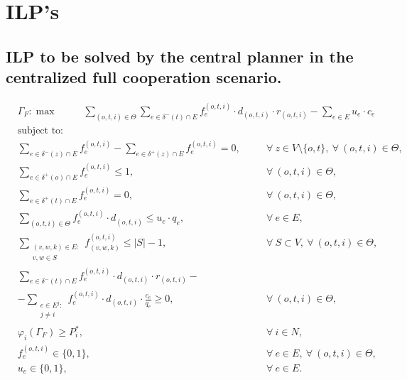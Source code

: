 \documentclass[review]{elsarticle}
\begin{document}


\appendix
\section{ILP's}
\label{seq:appendixilp}

\subsection{ILP to be solved by the central planner in the centralized full cooperation scenario.}

    \begin{align}
        &  \Gamma_F: \max  & \hspace{22pt} \sum_{(o,t,i)\in \Theta} \sum_{e \in \delta^-(t)\cap E}  f_e^{(o,t,i)} \cdot d_{(o,t,i)} \cdot r_{(o,t,i)} - \sum_{e\in E} u_{e}\cdot c_{e} \hspace{40pt} && 
    \end{align}
    \begin{align}
        & \text{subject to:}       && \nonumber \\
        & \sum_{e \in \delta^-(z)\cap E} f_e^{(o,t,i)} -\sum_{e \in \delta^+(z)\cap E} f_{e}^{(o,t,i)} = 0,\quad && \forall\ z\in V\setminus\{o,t\},\ \forall\ (o,t,i)\in\Theta, \\
& \sum_{e \in \delta^+(o)\cap E} f_e^{(o,t,i)} \leq 1, && \forall\ (o,t,i)\in \Theta, \\
 & \sum_{e \in \delta^+(t)\cap E} f_e^{(o,t,i)} = 0,  && \forall\ (o,t,i)\in \Theta,  \\
& \sum_{(o,t,i) \in \Theta} f_e^{(o,t,i)}\cdot d_{(o,t,i)}  \leq u_e\cdot q_e, && \forall\ e \in E,   \\
 & \sum_{\substack{(v,w,k) \in E\colon \\ v,w \in S}} f_{(v,w,k)}^{(o,t,i)} \leq |S| -1, && \forall\ S \subset V,\ \forall\ (o,t,i) \in \Theta,\\
&\sum_{e \in \delta^-(t)\cap E}  f_e^{(o,t,i)}  \cdot d_{(o,t,i)} \cdot r_{(o,t,i)} - && \nonumber\\
& -\sum_{\substack{e \in E^j\colon \\ j\not = i}} f_e^{(o,t,i)} \cdot d_{(o,t,i)} \cdot \frac{c_e}{q_e}\geq 0, && \forall\ (o,t,i) \in \Theta, \\
& \varphi_i(\Gamma_F) \geq P_i^*,  && \forall\ i\in N, \\
& f_e^{(o,t,i)} \in \{0,1\},  && \forall\ e \in E,\ \forall\ (o,t,i) \in \Theta,  \\
&  u_e  \in \{0,1\},  && \forall\ e \in E.
    \end{align}
\end{document}
